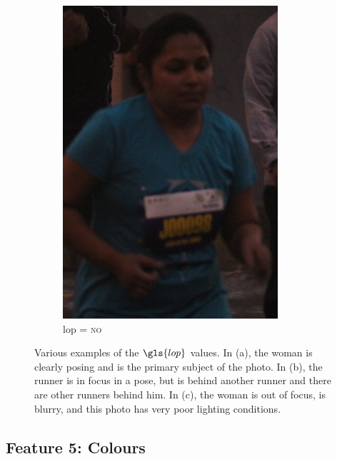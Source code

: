 \begin{figure}[p]
\begin{subfigure}[b]{0.25\textwidth}
    \includegraphics[width=\textwidth]{images/dataset/Prominence_LoP_No}
    \caption{\gls{lop} = \textsc{no}}
  \end{subfigure}
  \hspace{\fill}
  \caption[Variant Purchase Likelihoods]{Various examples of the $\gls{lop}$ values. In (a), the woman is clearly posing and is the primary subject of the photo. In (b), the runner is in focus in a pose, but is behind another runner and there are other runners behind him. In (c), the woman is out of focus, is blurry, and this photo has very poor lighting conditions.}
  \label{fig:dataset:lop_prominence}
\end{figure}

\subsection{Feature 5: Colours}

